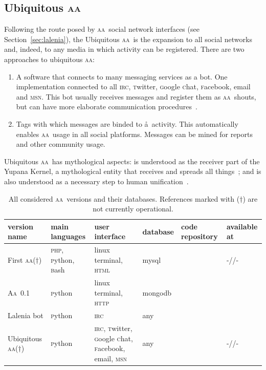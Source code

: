 \documentclass[a4paper, 11pt]{article} %
\newcommand{\php}{\textsc{php}}
\newcommand{\twitter}{\textsc{t}witter}
\newcommand{\facebook}{\textsc{f}acebook}
\newcommand{\msn}{\textsc{msn}}
\newcommand{\gchat}{\textsc{g}oogle \textsc{c}hat}
\newcommand{\bash}{\textsc{b}ash}
\newcommand{\python}{\textsc{p}ython}
\newcommand{\irc}{\textsc{irc}}
\newcommand{\httpb}{\textsc{http}}
\newcommand{\html}{\textsc{html}}
\newcommand{\aab}{\textsc{aa}}
\newcommand{\aai}{\textsc{Aa}}
\newcommand{\mongodb}{{\sc m}ongo{\sc db}}
\newcommand{\mysql}{{\sc m}y{\sc sql}}
\begin{document}
\subsection{Ubiquitous \aab}\label{sec:ubi}
Following the route posed by \aab\ social network interfaces (see Section~\ref{sec:lalenia}), the Ubiquitous \aab\ is the expansion to all social networks and, indeed, to any media in which activity can be registered. There are two approaches to ubiquitous \aab:
\begin{enumerate}
    \item A software that connects to many messaging services as a bot. One implementation connected to all \irc, \twitter, \gchat, \facebook, email and \msn. This bot usually receives messages and register them as \aab\ shouts, but can have more elaborate communication procedures~\cite{ubi}.
    \item Tags with which messages are binded to \aa\ activity. This automatically enables \aab\ usage in all social platforms. Messages can be mined for reports and other community usage.
\end{enumerate}

Ubiquitous \aab\ has mythological aspects: is understood as the receiver part of the Yupana Kernel, a mythological entity that receives and spreads all things~\cite{yupana}; and is also understood as a necessary step to human unification~\cite{wisaa,ciberiun}.

\begin{table}[!h]
  \centering
  \caption{All considered \aab\ versions and their databases. References marked with ($\dagger$) are not currently operational.}\label{tab:aas}
  \begin{tabular}{|l|p{2cm}|p{2cm}|l|p{2cm}|l|}\hline
      {\bf version name} & {\bf main languages} & {\bf user interface} & {\bf database} & {\bf code repository} & {\bf available at} \\\hline\hline
First \aab ($\dagger$) & \php, \python, \bash & linux terminal, \html & \mysql & \cite{aafc,aafs} & -//- \\\hline
\aai\ 0.1 & \python & linux terminal, \httpb & \mongodb & \cite{aa01r} & \cite{aa01c,aa01s} \\\hline
Lalenia bot & \python & \irc\ & any &\cite{lalenia} & \cite{lirc} \\\hline
Ubiquitous \aab ($\dagger$) & \python & \irc, \twitter, \gchat, \facebook, email, \msn & any & \cite{ubi} & -//- \\\hline
  \end{tabular}
\end{table}
\end{document}
